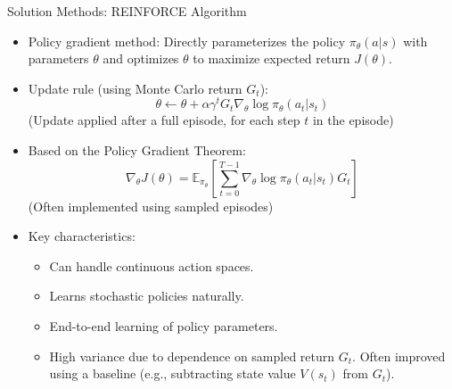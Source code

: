 \documentclass[10pt]{beamer}
\newcommand{\E}{\mathbb{E}}
\begin{document}

\begin{frame}{Solution Methods: REINFORCE Algorithm}
    \begin{itemize}
        \item Policy gradient method: Directly parameterizes the policy $\pi_\theta(a|s)$ with parameters $\theta$ and optimizes $\theta$ to maximize expected return $J(\theta)$.
        \item Update rule (using Monte Carlo return $G_t$):
        \begin{equation}
            \theta \leftarrow \theta + \alpha \gamma^t G_t \nabla_\theta \log \pi_\theta(a_t|s_t)
        \end{equation}
        (Update applied after a full episode, for each step $t$ in the episode)

        \item Based on the Policy Gradient Theorem:
        \begin{equation}
            \nabla_\theta J(\theta) = \E_{\pi_\theta} \left[ \sum_{t=0}^{T-1} \nabla_\theta \log \pi_\theta(a_t|s_t) G_t \right]
        \end{equation}
        (Often implemented using sampled episodes)

        \item Key characteristics:
        \begin{itemize}
            \item Can handle continuous action spaces.
            \item Learns stochastic policies naturally.
            \item End-to-end learning of policy parameters.
            \item High variance due to dependence on sampled return $G_t$. Often improved using a baseline (e.g., subtracting state value $V(s_t)$ from $G_t$).
        \end{itemize}
    \end{itemize}
\end{frame}

\end{document}

